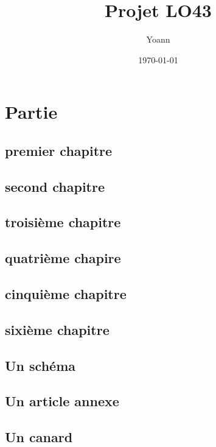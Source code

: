 \documentclass{report}
\title{Projet LO43}
\author{Yoann \bsc{Caplain}}
\date{\today}
\begin{document}
\maketitle \clearpage
\tableofcontents \clearpage

\part{Partie}
\chapter{premier chapitre}
\chapter{second chapitre}
\chapter{troisième chapitre}
\chapter{quatrième chapire}
\chapter{cinquième chapitre}
\chapter{sixième chapitre}

\appendix
\chapter{Un schéma}
\chapter{Un article annexe}
\chapter{Un canard}
\end{document}
